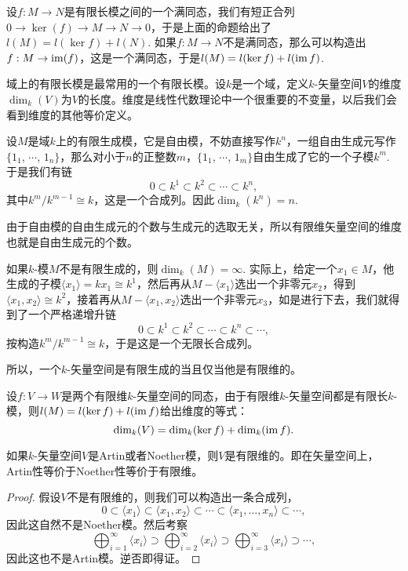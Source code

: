 设$f:M\to N$是有限长模之间的一个满同态，我们有短正合列$0\to \ker(f)\to M\to N\to 0$，于是上面的命题给出了$l(M)=l(\ker f)+l(N)$. 如果$f:M\to N$不是满同态，那么可以构造出$f:M\to \operatorname{im}(f)$，这是一个满同态，于是$l(M)=l(\ker f)+l(\operatorname{im} f)$. 

\para 域上的有限长模是最常用的一个有限长模。设$k$是一个域，定义$k$-矢量空间$V$的维度$\dim_k(V)$为$V$的长度。维度是线性代数理论中一个很重要的不变量，以后我们会看到维度的其他等价定义。

设$M$是域$k$上的有限生成模，它是自由模，不妨直接写作$k^n$，一组自由生成元写作$\{1_1$, $\cdots$, $1_n\}$，那么对小于$n$的正整数$m$，$\{1_1$, $\cdots$, $1_m\}$自由生成了它的一个子模$k^m$. 于是我们有链
\[
	0\subset k^1\subset  k^2 \subset \cdots \subset k^n,
\]
其中$k^m/k^{m-1}\cong k$，这是一个合成列。因此$\dim_k(k^n)=n$. 

由于自由模的自由生成元的个数与生成元的选取无关，所以有限维矢量空间的维度也就是自由生成元的个数。

如果$k$-模$M$不是有限生成的，则$\dim_k(M)=\infty$. 实际上，给定一个$x_1\in M$，他生成的子模$\langle x_1\rangle=kx_1\cong k^1$，然后再从$M-\langle x_1\rangle$选出一个非零元$x_2$，得到$\langle x_1,x_2\rangle\cong k^2$，接着再从$M-\langle x_1,x_2\rangle$选出一个非零元$x_3$，如是进行下去，我们就得到了一个严格递增升链
\[
	0\subset k^1\subset k^2\subset \cdots \subset k^n\subset \cdots,
\]
按构造$k^m/k^{m-1}\cong k$，于是这是一个无限长合成列。

所以，一个$k$-矢量空间是有限生成的当且仅当他是有限维的。

\begin{pro}[线性代数基本定理]
设$f:V\to W$是两个有限维$k$-矢量空间的同态，由于有限维$k$-矢量空间都是有限长$k$-模，则$l(M)=l(\ker f)+l(\operatorname{im} f)$给出维度的等式：
\[
	\dim_k(V)=\dim_k(\ker f)+\dim_k(\operatorname{im} f).
\]
\end{pro}

\begin{pro}
如果$k$-矢量空间$V$是Artin或者Noether模，则$V$是有限维的。即在矢量空间上，Artin性等价于Noether性等价于有限维。
\end{pro}

\begin{proof}
	假设$V$不是有限维的，则我们可以构造出一条合成列，
	\[
	0\subset \langle x_1\rangle\subset \langle x_1,x_2\rangle\subset \cdots \subset \langle x_1,\dots,x_n\rangle\subset \cdots,
	\]
	因此这自然不是Noether模。然后考察
	\[
		\bigoplus_{i=1}^\infty \langle x_i\rangle \supset \bigoplus_{i=2}^\infty \langle x_i\rangle \supset \bigoplus_{i=3}^\infty \langle x_i\rangle\supset \cdots,
	\]
	因此这也不是Artin模。逆否即得证。
\end{proof}

